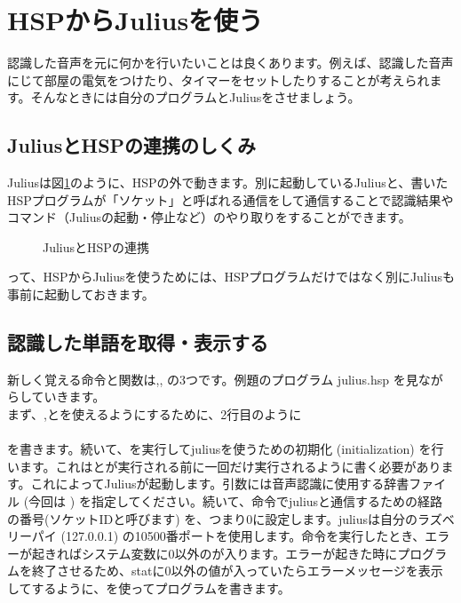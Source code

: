 \newpage
\section{HSPからJuliusを使う}
認識した音声を元に何かを行いたいことは良くあります。例えば、認識した音声にじて部屋の電気をつけたり、タイマーをセットしたりすることが考えられます。そんなときには自分のプログラムとJuliusをさせましょう。
\subsection{JuliusとHSPの連携のしくみ}
Juliusは図\ref{JuliusとHSPの連携}のように、HSPの外で動きます。別に起動しているJuliusと、書いたHSPプログラムが「ソケット」と呼ばれる通信をして通信することで認識結果やコマンド（Juliusの起動・停止など）のやり取りをすることができます。
\begin{figure}[H]
\begin{center}
    
    \caption{JuliusとHSPの連携}
    \label{JuliusとHSPの連携}
\end{center}
\end{figure}
って、HSPからJuliusを使うためには、HSPプログラムだけではなく別にJuliusも事前に起動しておきます。

\subsection{認識した単語を取得・表示する}
新しく覚える命令と関数は,,  の3つです。例題のプログラム julius.hsp を見ながらしていきます。\\

まず、,とを使えるようにするために、2行目のように\\
\\
を書きます。続いて、を実行してjuliusを使うための初期化 (initialization) を行います。これはとが実行される前に一回だけ実行されるように書く必要があります。これによってJuliusが起動します。引数には音声認識に使用する辞書ファイル (今回は ) を指定してください。続いて、命令でjuliusと通信するための経路 の番号(ソケットIDと呼びます) を、つまり0に設定します。juliusは自分のラズベリーパイ (127.0.0.1) の10500番ポートを使用します。命令を実行したとき、エラーが起きればシステム変数に0以外のが入ります。エラーが起きた時にプログラムを終了させるため、statに0以外の値が入っていたらエラーメッセージを表示してするように、を使ってプログラムを書きます。

